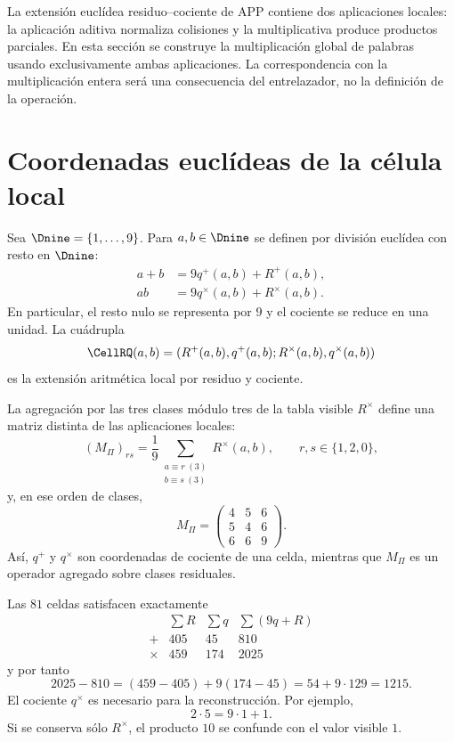 \label{int:chap:producto-nativo}

La extensión euclídea residuo--cociente de APP contiene dos aplicaciones
locales: la aplicación aditiva normaliza colisiones y la multiplicativa
produce productos parciales. En esta sección se construye la multiplicación
global de palabras usando exclusivamente ambas aplicaciones. La correspondencia con la multiplicación entera será una
consecuencia del entrelazador, no la definición de la operación.

\section{Coordenadas euclídeas de la célula local}

\begin{definition}
Sea $\Dnine=\{1,\ldots,9\}$. Para $a,b\in\Dnine$ se definen por división
euclídea con resto en $\Dnine$:
\begin{align}
 a+b&=9q^+(a,b)+R^+(a,b),\label{int:eq:local-plus}\\
 ab&=9q^\times(a,b)+R^\times(a,b).\label{int:eq:local-times}
\end{align}
En particular, el resto nulo se representa por $9$ y el cociente se reduce en
una unidad. La cuádrupla
\[
 \CellRQ(a,b)=
 (R^+(a,b),q^+(a,b);R^\times(a,b),q^\times(a,b))
\]
es la extensión aritmética local por residuo y cociente.
\end{definition}

La agregación por las tres clases módulo tres de la tabla visible
\(R^\times\) define una matriz distinta de las aplicaciones locales:
\[
(M_\Pi)_{rs}
=\frac19
\sum_{\substack{a\equiv r\;(3)\\b\equiv s\;(3)}}R^\times(a,b),
\qquad r,s\in\{1,2,0\},
\]
y, en ese orden de clases,
\[
M_\Pi=
\begin{pmatrix}4&5&6\\5&4&6\\6&6&9\end{pmatrix}.
\]
Así, \(q^+\) y \(q^\times\) son coordenadas de cociente de una celda,
mientras que \(M_\Pi\) es un operador agregado sobre clases residuales.

Las $81$ celdas satisfacen exactamente
\[
\begin{array}{c|rrrr}
 &\sum R&\sum q&\sum(9q+R)\\\hline
 +&405&45&810\\
 \times&459&174&2025
\end{array}
\]
y por tanto
\[
 2025-810=(459-405)+9(174-45)=54+9\cdot129=1215.
\]
El cociente $q^\times$ es necesario para la reconstrucción. Por ejemplo,
\[
 2\cdot5=9\cdot1+1.
\]
Si se conserva sólo $R^\times$, el producto $10$ se confunde con el valor
visible $1$.

